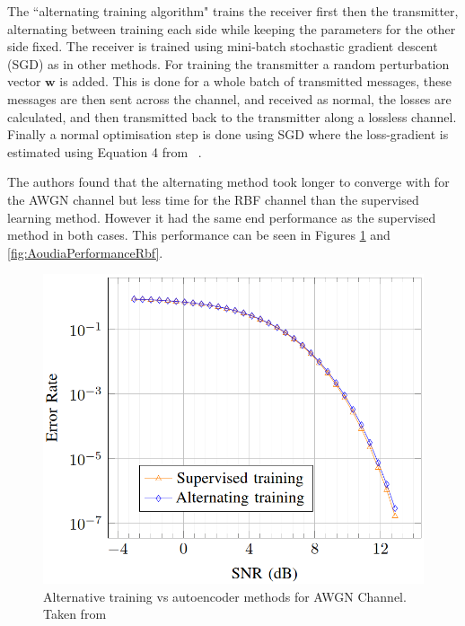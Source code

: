 \documentclass[12pt,onecolumn,letterpaper]{article}
\newcommand\genfigsize{0.5}
\begin{document}
The ``alternating training algorithm" trains the receiver first then the transmitter, alternating between training each side while keeping the parameters for the other side fixed. The receiver is trained using mini-batch stochastic gradient descent (SGD) as in other methods. For training the transmitter a random perturbation vector $\mathbf{w}$ is added. This is done for a whole batch of transmitted messages, these messages are then sent across the channel, and received as normal, the losses are calculated, and then transmitted back to the transmitter along a lossless channel. Finally a normal optimisation step is done using SGD where the loss-gradient is estimated using Equation 4 from ~\cite{Aoudia}. 

The authors found that the alternating method took longer to converge with for the AWGN channel but less time for the RBF channel than the supervised learning method. However it had the same end performance as the supervised method in both cases. This performance can be seen in Figures \ref{fig:AoudiaPerformanceAwgn} and \ref{fig:AoudiaPerformanceRbf}.

\begin{figure}[t]
   \centering
   \includegraphics[width=\genfigsize\linewidth]{figures/Aoudia_AWGN_performance.PNG}
   \caption{Alternative training vs autoencoder methods for AWGN Channel. Taken from~\cite{Aoudia}}
\label{fig:AoudiaPerformanceAwgn}
\end{figure}
\end{document}
